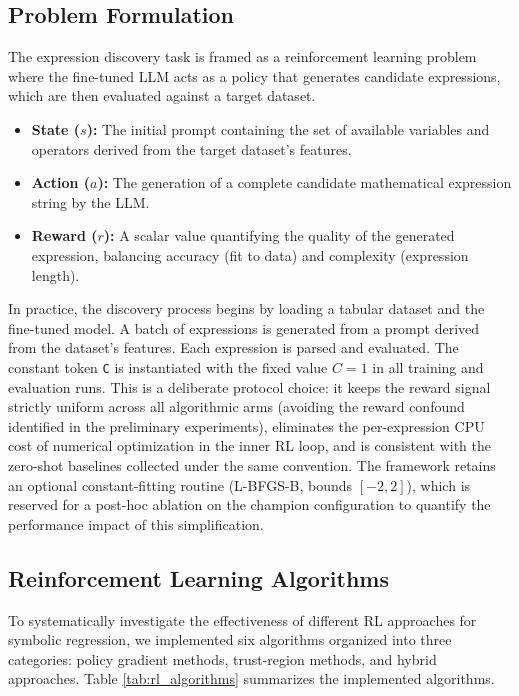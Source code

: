 \subsection{Problem Formulation}

The expression discovery task is framed as a reinforcement learning problem where the fine-tuned LLM acts as a policy that generates candidate expressions, which are then evaluated against a target dataset.

\begin{itemize}
    \item \textbf{State ($s$):} The initial prompt containing the set of available variables and operators derived from the target dataset's features.
    \item \textbf{Action ($a$):} The generation of a complete candidate mathematical expression string by the LLM.
    \item \textbf{Reward ($r$):} A scalar value quantifying the quality of the generated expression, balancing accuracy (fit to data) and complexity (expression length).
\end{itemize}

In practice, the discovery process begins by loading a tabular dataset and the fine-tuned model. A batch of expressions is generated from a prompt derived from the dataset's features. Each expression is parsed and evaluated. The constant token \texttt{C} is instantiated with the fixed value $C=1$ in all training and evaluation runs. This is a deliberate protocol choice: it keeps the reward signal strictly uniform across all algorithmic arms (avoiding the reward confound identified in the preliminary experiments), eliminates the per-expression CPU cost of numerical optimization in the inner RL loop, and is consistent with the zero-shot baselines collected under the same convention. The framework retains an optional constant-fitting routine (L-BFGS-B, bounds $[-2, 2]$), which is reserved for a post-hoc ablation on the champion configuration to quantify the performance impact of this simplification.

\subsection{Reinforcement Learning Algorithms}

To systematically investigate the effectiveness of different RL approaches for symbolic regression, we implemented six algorithms organized into three categories: policy gradient methods, trust-region methods, and hybrid approaches. Table \ref{tab:rl_algorithms} summarizes the implemented algorithms.

